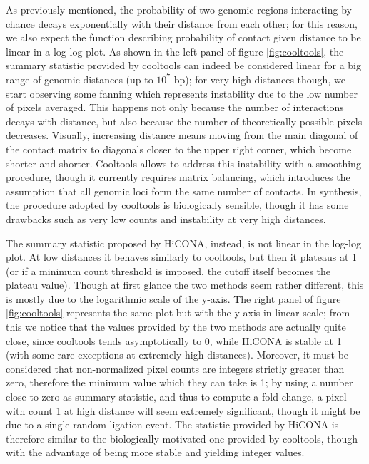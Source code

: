 As previously mentioned, the probability of two genomic regions interacting by chance decays exponentially with their distance from each other; for this reason, we also expect the function describing probability of contact given distance to be linear in a log-log plot. As shown in the left panel of figure \ref{fig:cooltools}, the summary statistic provided by cooltools can indeed be considered linear for a big range of genomic distances (up to $10^7$ bp); for very high distances though, we start observing some fanning which represents instability due to the low number of pixels averaged. This happens not only because the number of interactions decays with distance, but also because the number of theoretically possible pixels decreases. Visually, increasing distance means moving from the main diagonal of the contact matrix to diagonals closer to the upper right corner, which become shorter and shorter. Cooltools allows to address this instability with a smoothing procedure, though it currently requires matrix balancing, which introduces the assumption that all genomic loci form the same number of contacts. In synthesis, the procedure adopted by cooltools is biologically sensible, though it has some drawbacks such as very low counts and instability at very high distances.


The summary statistic proposed by HiCONA, instead, is not linear in the log-log plot. At low distances it behaves similarly to cooltools, but then it plateaus at 1 (or if a minimum count threshold is imposed, the cutoff itself becomes the plateau value). Though at first glance the two methods seem rather different, this is mostly due to the logarithmic scale of the y-axis. The right panel of figure \ref{fig:cooltools} represents the same plot but with the y-axis in linear scale; from this we notice that the values provided by the two methods are actually quite close, since cooltools tends asymptotically to 0, while HiCONA is stable at 1 (with some rare exceptions at extremely high distances). Moreover, it must be considered that non-normalized pixel counts are integers strictly greater than zero, therefore the minimum value which they can take is 1; by using a number close to zero as summary statistic, and thus to compute a fold change, a pixel with count 1 at high distance will seem extremely significant, though it might be due to a single random ligation event. The statistic provided by HiCONA is therefore similar to the biologically motivated one provided by cooltools, though with the advantage of being more stable and yielding integer values.


